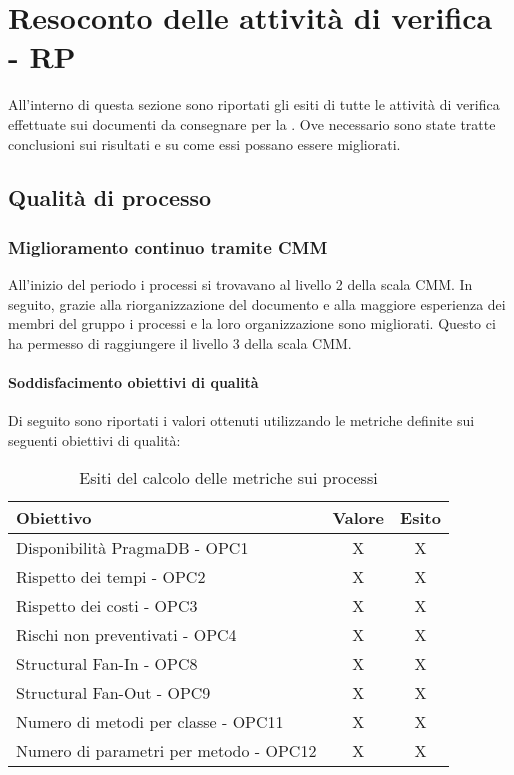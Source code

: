 \documentclass[PdQ.tex]{subfiles}
\begin{document}
\section{Resoconto delle attività di verifica - RP}
All'interno di questa sezione sono riportati gli esiti di tutte le attività di verifica effettuate sui documenti da consegnare per la \RP{}. Ove necessario sono state tratte conclusioni sui risultati e su come essi possano essere migliorati.

\subsection{Qualità di processo}
		\subsubsection{Miglioramento continuo tramite CMM}
	
		All'inizio del periodo i processi si trovavano al livello 2 della scala CMM. In seguito, grazie alla riorganizzazione del documento \NPdocRP{} e alla maggiore esperienza dei membri del gruppo i processi e la loro organizzazione sono migliorati. Questo ci ha permesso di raggiungere il livello 3 della scala CMM. 

		\paragraph{Soddisfacimento obiettivi di qualità}
			Di seguito sono riportati i valori ottenuti utilizzando le metriche definite sui seguenti obiettivi di qualità:
			\begin{table}[h]
				\centering
				\begin{tabular}{l c c}
					\hline
					\rule[-0.3cm]{0cm}{0.8cm}
					\textbf{Obiettivo} & \textbf{Valore} & \textbf{Esito} \\
					\hline
					\rule[0cm]{0cm}{0.4cm}
					Disponibilità PragmaDB - OPC1 & X & X \\
					\rule[0cm]{0cm}{0.4cm}
					Rispetto dei tempi - OPC2 & X & X \\
					\rule[0cm]{0cm}{0.4cm}
					Rispetto dei costi - OPC3 & X & X\\ 
					\rule[0cm]{0cm}{0.4cm}
					Rischi non preventivati - OPC4 & X & X\\ 
					\rule[0cm]{0cm}{0.4cm}
					Structural Fan-In - OPC8 & X & X\\ 
					\rule[0cm]{0cm}{0.4cm}
					Structural Fan-Out - OPC9 & X & X\\ 
					\rule[0cm]{0cm}{0.4cm}
					Numero di metodi per classe - OPC11 & X & X\\ 
					\rule[0cm]{0cm}{0.4cm}
					Numero di parametri per metodo - OPC12 & X & X\\ 
					\hline
				\end{tabular}
				\caption{Esiti del calcolo delle metriche sui processi}
			\end{table}
		
\end{document}

